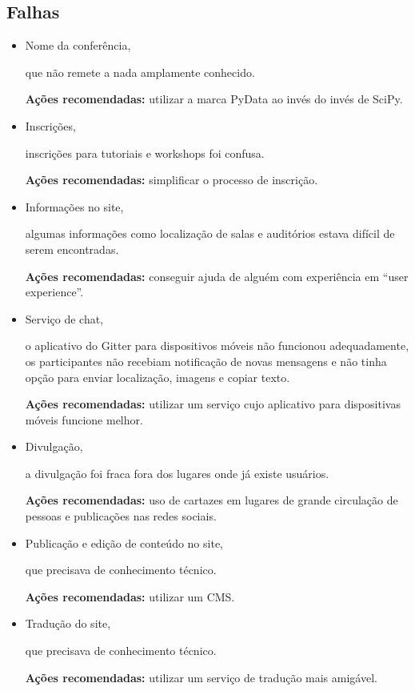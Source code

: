 \documentclass[12pt]{article}
\begin{document}
\subsection*{Falhas}

\begin{itemize}
  \item Nome da conferência,

    que não remete a nada amplamente conhecido.

    \textbf{Ações recomendadas:} utilizar a marca PyData ao invés do invés de
    SciPy.

  \item Inscrições,

    inscrições para tutoriais e workshops foi confusa.

    \textbf{Ações recomendadas:} simplificar o processo de inscrição.

  \item Informações no site,

    algumas informações como localização de salas e auditórios estava difícil de
    serem encontradas.

    \textbf{Ações recomendadas:} conseguir ajuda de alguém com experiência em
    ``user experience''.

  \item Serviço de chat,

    o aplicativo do Gitter para dispositivos móveis não funcionou adequadamente,
    os participantes não recebiam notificação de novas mensagens e não tinha
    opção para enviar localização, imagens e copiar texto.

    \textbf{Ações recomendadas:} utilizar um serviço cujo aplicativo para
    dispositivas móveis funcione melhor.

  \item Divulgação,

    a divulgação foi fraca fora dos lugares onde já existe usuários.

    \textbf{Ações recomendadas:} uso de cartazes em lugares de grande circulação
    de pessoas e publicações nas redes sociais.

  \item Publicação e edição de conteúdo no site,

    que precisava de conhecimento técnico.

    \textbf{Ações recomendadas:} utilizar um CMS.

  \item Tradução do site,

    que precisava de conhecimento técnico.

    \textbf{Ações recomendadas:} utilizar um serviço de tradução mais amigável.
\end{itemize}
\end{document}
